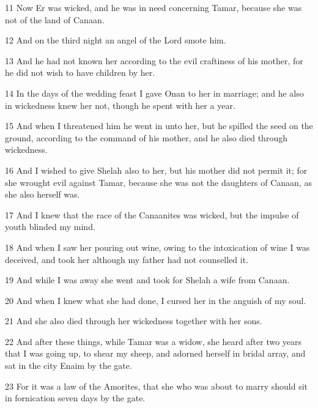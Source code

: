 \par 11 Now Er was wicked, and he was in need concerning Tamar, because she was not of the land of Canaan.

\par 12 And on the third night an angel of the Lord smote him.

\par 13 And he had not known her according to the evil craftiness of his mother, for he did not wish to have children by her.

\par 14 In the days of the wedding feast I gave Onan to her in marriage; and he also in wickedness knew her not, though he spent with her a year.

\par 15 And when I threatened him he went in unto her, but he spilled the seed on the ground, according to the command of his mother, and he also died through wickedness.

\par 16 And I wished to give Shelah also to her, but his mother did not permit it; for she wrought evil against Tamar, because she was not the daughters of Canaan, as she also herself was.

\par 17 And I knew that the race of the Canaanites was wicked, but the impulse of youth blinded my mind.

\par 18 And when I saw her pouring out wine, owing to the intoxication of wine I was deceived, and took her although my father had not counselled it.

\par 19 And while I was away she went and took for Shelah a wife from Canaan.

\par 20 And when I knew what she had done, I cursed her in the anguish of my soul.

\par 21 And she also died through her wickedness together with her sons.

\par 22 And after these things, while Tamar was a widow, she heard after two years that I was going up, to shear my sheep, and adorned herself in bridal array, and sat in the city Enaim by the gate.

\par 23 For it was a law of the Amorites, that she who was about to marry should sit in fornication seven days by the gate.

